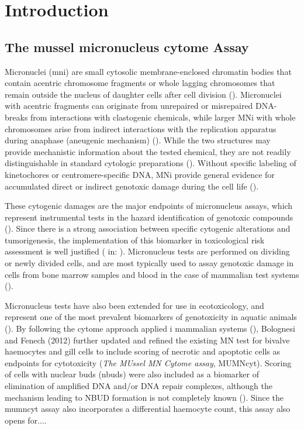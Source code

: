 \chapter{Introduction}
\section{The mussel micronucleus cytome Assay}
Micronuclei (\acrshort{mni}) are small cytosolic membrane-enclosed chromatin bodies that contain acentric chromosome fragments or whole lagging chromosomes that remain outside the nucleus of daughter cells after cell division (\cite{Fenech2011}). Micronuclei with acentric fragments can originate from unrepaired or misrepaired DNA-breaks from interactions with clastogenic chemicals, while larger MNi with whole chromosomes arise from indirect interactions with the replication apparatus during anaphase (aneugenic mechanism) (\cite{Fenech2011}). While the two structures may provide mechanistic information about the tested chemical, they are not readily distinguishable in standard cytologic preparations (\cite{Natarajan1993}). Without specific labeling of kinetochores or centromere-specific DNA, MNi provide general evidence for accumulated direct or indirect genotoxic damage during the cell life (\cite{Tucker1996, Lynch1993}).

These cytogenic damages are the major endpoints of micronucleus assays, which represent instrumental tests in the hazard identification of genotoxic compounds (\cite{OECD474, OECD487, USEPA1998}). Since there is a strong association between specific cytogenic alterations and tumorigenesis, the implementation of this biomarker in toxicological risk assessment is well justified (\cite{Mitelman1983} in: \cite{Tucker1996}). Micronucleus tests are performed on dividing or newly divided cells, and are most typically used to assay genotoxic damage in cells from bone marrow samples and blood in the case of mammalian test systems (\cite{Heddle1983, Warheit2018b}).

Micronucleus tests have also been extended for use in ecotoxicology, and represent one of the most prevalent biomarkers of genotoxicity in aquatic animals (\cite{Bolognesi2012, Bolognesi2014}). By following the cytome approach applied i mammalian systems (\cite{Fenech2007}), Bolognesi and Fenech (2012) further updated and refined the existing MN test for bivalve haemocytes and gill cells to include scoring of necrotic and apoptotic cells as endpoints for cytotoxicity (\emph{The MUssel MN Cytome assay}, MUMNcyt). Scoring of cells with nuclear buds (\acrshort{nbuds}) were also included as a biomarker of elimination of amplified DNA and/or DNA repair complexes, although the mechanism leading to NBUD formation is not completely known (\cite{Bolognesi2012}). Since the \acrshort{mumncyt} assay also incorporates a differential haemocyte count, this assay also opens for....

